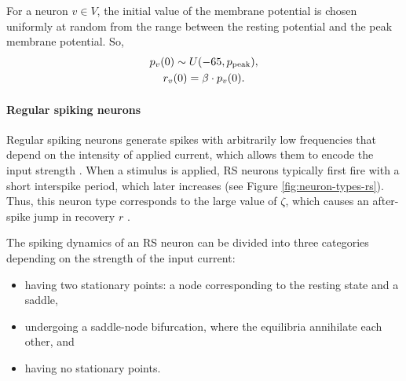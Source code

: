 For a neuron $v \in V$, the initial value of the membrane potential is chosen uniformly at random from the range between the resting potential and the peak membrane potential. So, 
\begin{equation}
\begin{gathered}
    p_v(0) \sim U(-65, p_{\mathrm{peak}}), \\
    r_v(0) = \beta \cdot p_v(0).
\end{gathered}
\end{equation}

\paragraph{Regular spiking neurons}

Regular spiking neurons generate spikes with arbitrarily low frequencies that depend on the intensity of applied current, which allows them to encode the input strength \cite{IzhikevichBook2004:10}.
When a stimulus is applied, RS neurons typically first fire with a short interspike period, which later increases (see Figure \ref{fig:neuron-types-rs}). Thus, this neuron type corresponds to the large value of $\zeta$, which causes an after-spike jump in recovery $r$ \cite{Izhikevich2003}.

The spiking dynamics of an RS neuron can be divided into three categories depending on the strength of the input current:
\begin{itemize}
    \item having two stationary points: a node corresponding to the resting state and a saddle,
    \item undergoing a saddle-node bifurcation, where the equilibria annihilate each other, and
    \item having no stationary points.
\end{itemize}

